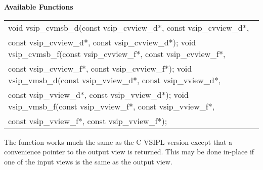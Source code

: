 \cvsiplh
\newline \hspace*{.8cm} \vspace*{.1cm} \textbf{Available Functions }
\newline \hspace*{1.1cm} {
\ttfamily
\begin{tabular}[H]{l}
void vsip\_cvmsb\_d(const vsip\_cvview\_d*, const vsip\_cvview\_d*,\\*\hspace{.7cm}const vsip\_cvview\_d*, const vsip\_cvview\_d*);
void vsip\_cvmsb\_f(const vsip\_cvview\_f*, const vsip\_cvview\_f*,\\*\hspace{.7cm}const vsip\_cvview\_f*, const vsip\_cvview\_f*); 
void vsip\_vmsb\_d(const vsip\_vview\_d*, const vsip\_vview\_d*,\\*\hspace{.7cm}const vsip\_vview\_d*, const vsip\_vview\_d*); 
void vsip\_vmsb\_f(const vsip\_vview\_f*, const vsip\_vview\_f*,\\*\hspace{.7cm}const vsip\_vview\_f*, const vsip\_vview\_f*); 
\end{tabular}
}
\pyjvsiph
{}
\newline\hspace*{1.2cm}\parbox{10.8cm}{\vspace*{.1cm}The  function works much the same as the C VSIPL version except that a convenience pointer to the output view is returned. This may be done in-place if one of the input views is the same as the output view.}